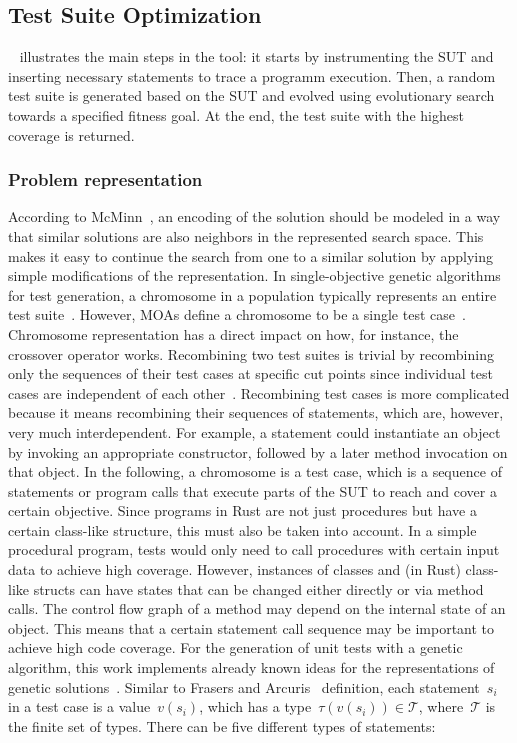 \documentclass{article}
\begin{document}
\subsection{Test Suite Optimization}
~ illustrates the main steps in the tool: it starts by instrumenting the \ac{SUT} and inserting necessary statements to trace a programm execution. Then, a random test suite is generated based on the \ac{SUT} and evolved using evolutionary search towards a specified fitness goal. At the end, the test suite with the highest coverage is returned. 

\subsubsection{Problem representation}
According to McMinn~\cite{McMinn_2004}, an encoding of the solution should be modeled in a way that similar solutions are also neighbors in the represented search space. This makes it easy to continue the search from one to a similar solution by applying simple modifications of the representation. In single-objective genetic algorithms for test generation, a chromosome in a population typically represents an entire test suite~\cite{Fraser_2011, Campos2017}. However, \acp{MOA} define a chromosome to be a single test case~\cite{Panichella2018}. Chromosome representation has a direct impact on how, for instance, the crossover operator works. Recombining two test suites is trivial by recombining only the sequences of their test cases at specific cut points since individual test cases are independent of each other~\cite{Fraser_2013}. Recombining test cases is more complicated because it means recombining their sequences of statements, which are, however, very much interdependent. For example, a statement could instantiate an object by invoking an appropriate constructor, followed by a later method invocation on that object. In the following, a chromosome is a test case, which is a sequence of statements or program calls that execute parts of the \ac{SUT} to reach and cover a certain objective. Since programs in Rust are not just procedures but have a certain class-like structure, this must also be taken into account. In a simple procedural program, tests would only need to call procedures with certain input data to achieve high coverage. However, instances of classes and (in Rust) class-like structs can have states that can be changed either directly or via method calls. The control flow graph of a method may depend on the internal state of an object. This means that a certain statement call sequence may be important to achieve high code coverage. For the generation of unit tests with a genetic algorithm, this work implements already known ideas for the representations of genetic solutions~\cite{Fraser2012,Tonella2004,Arcuri2008}. Similar to Frasers and Arcuris~\cite{Fraser_2011} definition, each statement~$s_i$ in a test case is a value~$v(s_i)$, which has a type~$\tau(v(s_i)) \in \mathcal{T}$, where~$\mathcal{T}$ is the finite set of types. There can be five different types of statements: 
\end{document}
